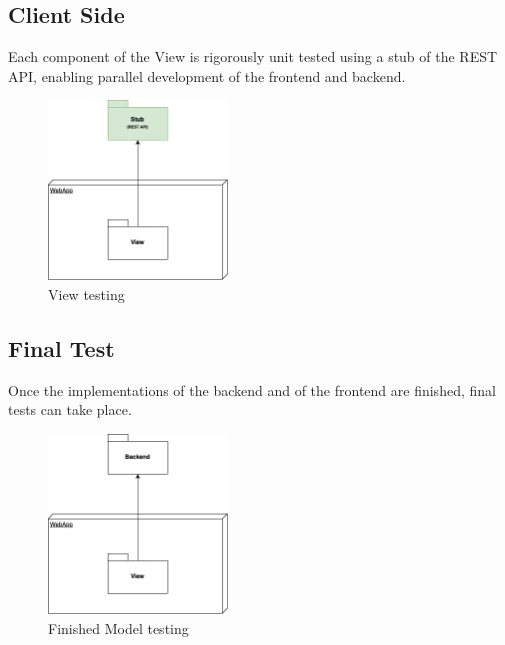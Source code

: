 \newpage

\subsection{Client Side}

Each component of the View is rigorously unit tested using a stub of the REST API, enabling
parallel development of the frontend and backend.

\begin{figure}[H]
    \centering
    \includegraphics[width=180px]{../../assets/pakege-diagram/implementation_plan_5.png}
    \caption{View testing}
\end{figure}


\subsection{Final Test}

Once the implementations of the backend and of the frontend are finished, final tests can take place.

\begin{figure}[H]
    \centering
    \includegraphics[width=180px]{../../assets/pakege-diagram/implementation_plan_6.png}
    \caption{Finished Model testing}
\end{figure}




